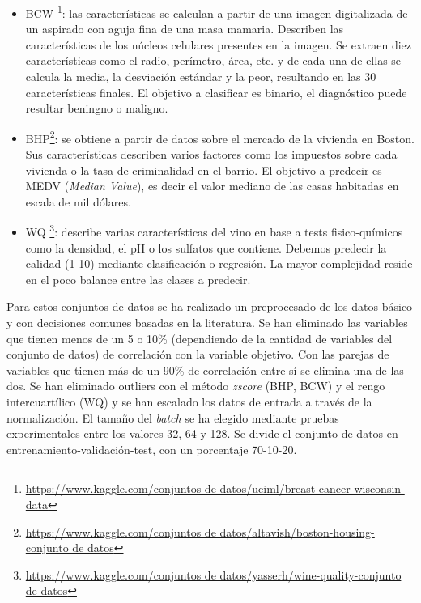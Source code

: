 \begin{itemize}

\item BCW \footnote{\url{https://www.kaggle.com/conjuntos de datos/uciml/breast-cancer-wisconsin-data}}: las características se calculan a partir de una imagen digitalizada de un aspirado con aguja fina de una masa mamaria. Describen las características de los núcleos celulares presentes en la imagen. Se extraen diez características como el radio, perímetro, área, etc. y de cada una de ellas se calcula la media, la desviación estándar y la peor, resultando en las 30 características finales. El objetivo a clasificar es binario, el diagnóstico puede resultar beningno o maligno. 

\item BHP\footnote{\url{https://www.kaggle.com/conjuntos de datos/altavish/boston-housing-conjunto de datos}}: se obtiene a partir de datos sobre el mercado de la vivienda en Boston. Sus características describen varios factores como los impuestos sobre cada vivienda o la tasa de criminalidad en el barrio. El objetivo a predecir es MEDV (\textit{Median Value}), es decir el valor mediano de las casas habitadas en escala de mil dólares.

\item WQ \footnote{\url{https://www.kaggle.com/conjuntos de datos/yasserh/wine-quality-conjunto de datos}}: describe varias características del vino en base a tests fisico-químicos como la densidad, el pH o los sulfatos que contiene. Debemos predecir la calidad (1-10) mediante clasificación o regresión. La mayor complejidad reside en el poco balance entre las clases a predecir.

\end{itemize}

Para estos conjuntos de datos se ha realizado un preprocesado de los datos básico y con decisiones comunes basadas en la literatura. Se han eliminado las variables que tienen menos de un 5 o 10\% (dependiendo de la cantidad de variables del conjunto de datos) de correlación con la variable objetivo. Con las parejas de variables que tienen más de un 90\% de correlación entre sí se elimina una de las dos. Se han eliminado outliers con el método \textit{zscore} (BHP, BCW) y el rengo intercuartílico (WQ) y se han escalado los datos de entrada a través de la normalización. El tamaño del \textit{batch} se ha elegido mediante pruebas experimentales entre los valores 32, 64 y 128. Se divide el conjunto de datos en entrenamiento-validación-test, con un porcentaje 70-10-20. 



